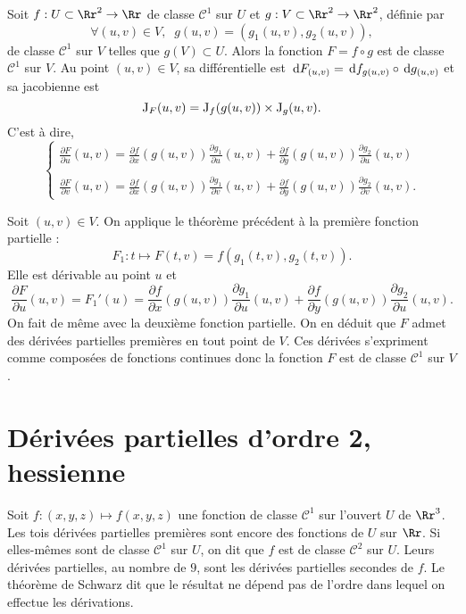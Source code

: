 \documentclass[class=report,crop=false]{standalone}
\begin{document}
\vskip6mm

\begin{theoreme}Soit $f:U\subset \Rr^2\to \Rr$ de classe ${\mathscr C}^1$ sur $U$ et $g:V\subset \Rr^2\to \Rr^2$, définie par
$$\forall (u,v)\in V,\;\; g(u,v)=\left(g_1(u,v),g_2(u,v)\right),$$
de classe ${\mathscr C}^1$ sur $V$ telles que $g(V)\subset U$. Alors la fonction $F=f\circ g$ est de classe ${\mathscr C}^1$ sur $V$. Au point $(u,v)\in V$, sa différentielle est $\,\mathrm{d} F_{(u,v)}=\,\mathrm{d} f_{g(u,v)}\circ \,\mathrm{d} g_{(u,v)}$ et sa jacobienne est
$$\mathrm{J} _{F}(u,v)=\mathrm{J} _f(g(u,v))\times \mathrm{J} _g(u,v).$$
C'est à dire,
$$\left\{\begin{array}{l}\displaystyle \frac{\partial F}{\partial u}(u,v)=\frac{\partial f}{\partial x}(g(u,v))\frac{\partial g_1}{\partial u}(u,v)+\frac{\partial f}{\partial y}(g(u,v))\frac{\partial g_2}{\partial u}(u,v)\\ \\ \displaystyle \frac{\partial F}{\partial v}(u,v)=\frac{\partial f}{\partial x}(g(u,v))\frac{\partial g_1}{\partial v}(u,v)+\frac{\partial f}{\partial y}(g(u,v))\frac{\partial g_2}{\partial v}(u,v).\end{array}\right.$$
\end{theoreme}

\vskip4mm

Soit $(u,v)\in V$. On applique le théorème précédent à la première fonction partielle :
$$F_1:t\mapsto F(t,v)=f\left(g_1(t,v),g_2(t,v)\right).$$
Elle est dérivable au point $u$ et
$$\frac{\partial F}{\partial u}(u,v)=F_1'(u)=\frac{\partial f}{\partial x}(g(u,v))\frac{\partial g_1}{\partial u}(u,v)+\frac{\partial f}{\partial y}(g(u,v))\frac{\partial g_2}{\partial u}(u,v).$$
On fait de m\^eme avec la deuxième fonction partielle. On en déduit que $F$ admet des dérivées partielles premières en tout point de $V$. Ces dérivées s'expriment comme
composées de fonctions continues donc la fonction $F$ est de classe ${\mathscr C}^1$ sur $V$.

\vskip8mm

\section{Dérivées partielles d'ordre 2, hessienne}

\vskip4mm

\noindent Soit $f:(x,y,z)\mapsto f(x,y,z)$ une fonction de classe $\mathscr{C}^1$ sur l'ouvert $U$ de $\Rr^3$. Les tois dérivées partielles premières sont encore des fonctions de $U$ sur $\Rr$. Si elles-m\^emes sont de classe $\mathscr{C}^1$ sur $U$, on dit que $f$ est de classe $\mathscr{C}^2$ sur $U$. Leurs dérivées partielles, au nombre de $9$, sont les dérivées partielles secondes de $f$. Le théorème de Schwarz dit que le résultat ne dépend pas de l'ordre dans lequel on effectue les dérivations.
\end{document}
